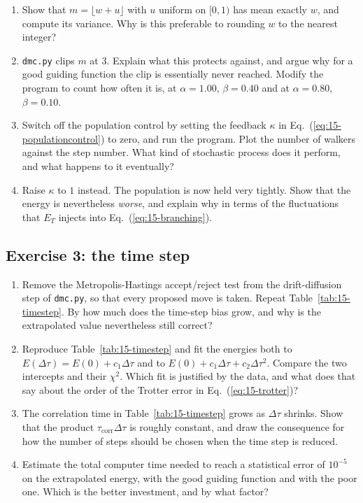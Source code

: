\begin{enumerate}
\item[a)] Show that $m=\lfloor w+u\rfloor$ with $u$ uniform on $[0,1)$ has
  mean exactly $w$, and compute its variance.  Why is this preferable to
  rounding $w$ to the nearest integer?

\item[b)] \texttt{dmc.py} clips $m$ at $3$.  Explain what this protects
  against, and argue why for a good guiding function the clip is essentially
  never reached.  Modify the program to count how often it is, at
  $\alpha=1.00$, $\beta=0.40$ and at $\alpha=0.80$, $\beta=0.10$.

\item[c)] Switch off the population control by setting the feedback $\kappa$
  in Eq.~(\ref{eq:15-populationcontrol}) to zero, and run the program.  Plot
  the number of walkers against the step number.  What kind of stochastic
  process does it perform, and what happens to it eventually?

\item[d)] Raise $\kappa$ to $1$ instead.  The population is now held very
  tightly.  Show that the energy is nevertheless \emph{worse}, and explain why
  in terms of the fluctuations that $E_T$ injects into
  Eq.~(\ref{eq:15-branching}).
\end{enumerate}

\subsection*{Exercise 3: the time step}
\label{ex:15-timestep}

\begin{enumerate}
\item[a)] Remove the Metropolis-Hastings accept/reject test from the
  drift-diffusion step of \texttt{dmc.py}, so that every proposed move is
  taken.  Repeat Table~\ref{tab:15-timestep}.  By how much does the time-step
  bias grow, and why is the extrapolated value nevertheless still correct?

\item[b)] Reproduce Table~\ref{tab:15-timestep} and fit the energies both to
  $E(\Delta\tau)=E(0)+c_1\Delta\tau$ and to
  $E(0)+c_1\Delta\tau+c_2\Delta\tau^2$.  Compare the two intercepts and their
  $\chi^2$.  Which fit is justified by the data, and what does that say about
  the order of the Trotter error in Eq.~(\ref{eq:15-trotter})?

\item[c)] The correlation time in Table~\ref{tab:15-timestep} grows as
  $\Delta\tau$ shrinks.  Show that the product
  $\tau_{\mathrm{corr}}\Delta\tau$ is roughly constant, and draw the
  consequence for how the number of steps should be chosen when the time step
  is reduced.

\item[d)] Estimate the total computer time needed to reach a statistical error
  of $10^{-5}$ on the extrapolated energy, with the good guiding function and
  with the poor one.  Which is the better investment, and by what factor?
\end{enumerate}

